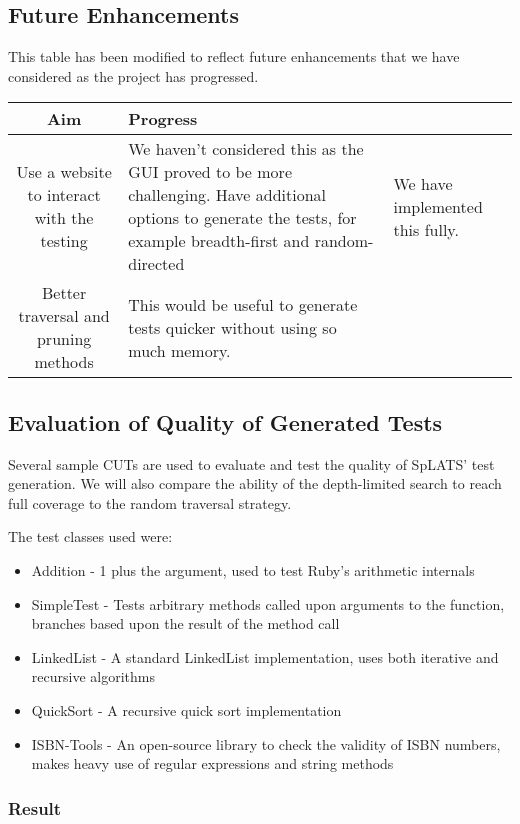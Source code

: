   \subsection{Future Enhancements}
    This table has been modified to reflect future enhancements that we have considered as the project has progressed.
    \begin{tabular}{| c | p{\colwidth} | p{\colwidth} |}
    \hline
    \textbf{Aim} & \textbf{Progress} \\
    \hline
    Use a website to interact with the testing &
    We haven't considered this as the GUI proved to be more challenging.
    \hline
    Have additional options to generate the tests, for example breadth-first and random-directed &
    We have implemented this fully. \\
    \hline
    Better traversal and pruning methods &
    This would be useful to generate tests quicker without using so much memory. \\
    \hline
    \end{tabular}

  \subsection{Evaluation of Quality of Generated Tests}
    Several sample CUTs are used to evaluate and test the quality of SpLATS'
test generation. We will also compare the ability of the depth-limited search to
reach full coverage to the random traversal strategy.

    The test classes used were:
    \begin{itemize}
      \item Addition - 1 plus the argument, used to test Ruby's arithmetic
internals
      \item SimpleTest - Tests arbitrary methods called upon arguments to the
function, branches based upon the result of the method call
      \item LinkedList - A standard LinkedList implementation, uses both
iterative and recursive algorithms
      \item QuickSort - A recursive quick sort implementation
      \item ISBN-Tools - An open-source library to check the validity of ISBN
numbers, makes heavy use of regular expressions and string methods
    \end{itemize}

  \subsubsection{Result}

